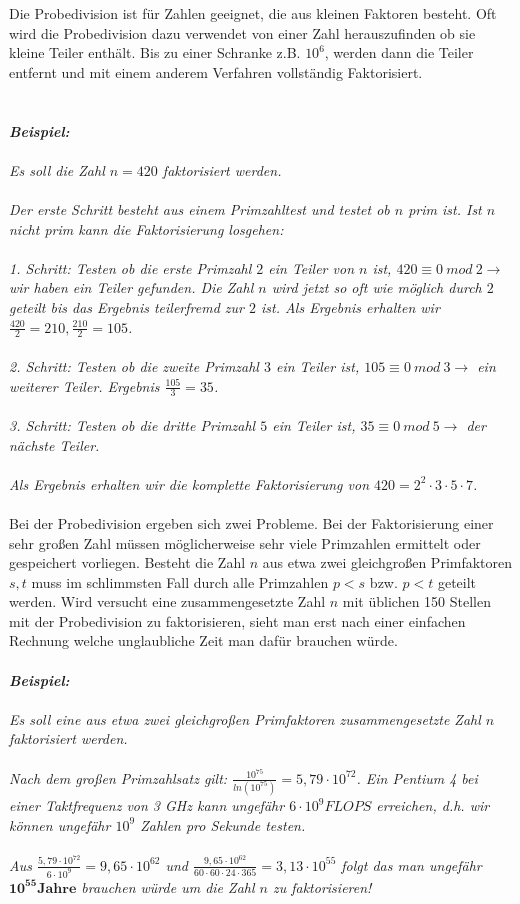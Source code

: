 \documentclass[10pt, bigheadings]{scrartcl}
\begin{document}
Die Probedivision ist für Zahlen geeignet, die aus kleinen Faktoren
besteht. Oft wird die Probedivision dazu verwendet von einer Zahl
herauszufinden ob sie kleine Teiler enthält. Bis zu einer Schranke
z.B. $10^6$, werden dann die Teiler entfernt und mit einem anderem
Verfahren vollständig Faktorisiert.\\\\\\
{\it
\textbf{Beispiel:}\\\\
Es soll die Zahl $n=420$ faktorisiert werden.\\\\
Der erste Schritt besteht aus einem Primzahltest und
testet ob $n$ prim ist. Ist $n$ nicht prim kann die Faktorisierung losgehen:\\\\
1. Schritt: Testen ob die erste Primzahl $2$ ein Teiler von $n$ ist, $420\equiv0\ mod\ 2 \rightarrow$
wir haben ein Teiler gefunden. Die Zahl $n$ wird jetzt so oft wie möglich durch $2$
geteilt bis das Ergebnis teilerfremd zur $2$ ist. Als Ergebnis erhalten wir
$\frac{420}{2} = 210, \frac{210}{2} = 105$.\\\\
2. Schritt: Testen ob die zweite Primzahl $3$ ein Teiler ist, $105\equiv 0\ mod\ 3 \rightarrow$
ein weiterer Teiler. Ergebnis $\frac{105}{3} = 35$.\\\\
3. Schritt: Testen ob die dritte Primzahl $5$ ein Teiler ist, $35\equiv 0\ mod\ 5 \rightarrow$ der
nächste Teiler.\\\\
Als Ergebnis erhalten wir die komplette Faktorisierung von $420 = 2^2\cdot3\cdot5\cdot7$.\\\\
}
Bei der Probedivision ergeben sich zwei Probleme. Bei der Faktorisierung einer
sehr großen Zahl müssen möglicherweise sehr viele Primzahlen ermittelt oder
gespeichert vorliegen. Besteht die Zahl $n$ aus etwa zwei gleichgroßen Primfaktoren
$s,t$ muss im schlimmsten Fall durch alle Primzahlen $p<s$ bzw. $p<t$ geteilt werden.
Wird versucht eine zusammengesetzte Zahl $n$ mit üblichen 150 Stellen mit der
Probedivision zu faktorisieren, sieht man erst nach einer einfachen Rechnung
welche unglaubliche Zeit man dafür brauchen würde.\\\\
{\it
\textbf{Beispiel:}\\\\
Es soll eine aus etwa zwei gleichgroßen Primfaktoren zusammengesetzte Zahl $n$
faktorisiert werden.\\\\
Nach dem großen Primzahlsatz gilt: $\frac{10^{75}}{ln(10^{75})} = 5,79\cdot10^{72}$.
Ein Pentium 4 bei einer Taktfrequenz von 3 GHz kann ungefähr $6\cdot10^9 FLOPS$
erreichen, d.h. wir können ungefähr $10^9$ Zahlen pro Sekunde testen.\\\\
Aus $\frac{5,79\cdot10^{72}}{6\cdot10^9} = 9,65\cdot10^{62}$ und
$\frac{9,65\cdot10^{62}}{60\cdot60\cdot24\cdot365} = 3,13\cdot10^{55}$ folgt das
man ungefähr $\mathbf{10^{55} Jahre}$ brauchen würde um die Zahl $n$ zu faktorisieren!
}
\end{document}

